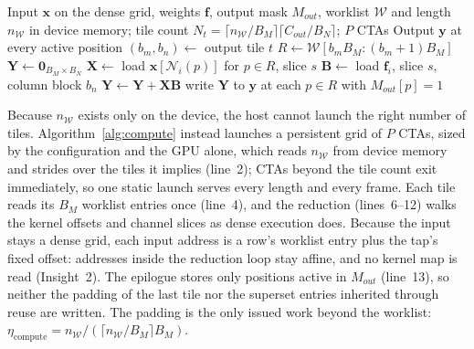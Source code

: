 \begin{algorithm}[t]
\caption{Worklist-Driven Tiled Compute (configuration $q$)}
\label{alg:compute}
\begin{algorithmic}[1]
\REQUIRE Input $\mathbf{x}$ on the dense grid, weights $\mathbf{f}$, output
  mask $M_{out}$, worklist $\mathcal{W}$ and length $n_{\mathcal{W}}$ in device
  memory; tile count
  $N_t=\lceil n_{\mathcal{W}}/B_M\rceil\lceil C_{out}/B_N\rceil$; $P$ CTAs
\ENSURE Output $\mathbf{y}$ at every active position
    \STATE $(b_m,b_n)\leftarrow$ output tile $t$
    \STATE $R\leftarrow\mathcal{W}[b_mB_M:(b_m+1)B_M]$ 
    \STATE $\mathbf{Y}\leftarrow\mathbf{0}_{B_M\times B_N}$
        \STATE $\mathbf{X}\leftarrow$ load $\mathbf{x}[\mathcal{N}_i(p)]$ for $p\in R$, slice $s$
        \STATE $\mathbf{B}\leftarrow$ load $\mathbf{f}_i$, slice $s$, column block $b_n$
        \STATE $\mathbf{Y}\leftarrow\mathbf{Y}+\mathbf{X}\mathbf{B}$
      \ENDFOR
    \ENDFOR
    \STATE write $\mathbf{Y}$ to $\mathbf{y}$ at each $p\in R$ with $M_{out}[p]=1$
  \ENDFOR
\ENDFOR
\end{algorithmic}
\end{algorithm}

Because $n_{\mathcal{W}}$ exists only on the device, the host cannot launch
the right number of tiles. Algorithm~\ref{alg:compute} instead launches a
persistent grid of $P$ CTAs, sized by the configuration and the GPU alone,
which reads $n_{\mathcal{W}}$ from device memory and strides over the tiles it
implies (line~2); CTAs beyond the tile count exit immediately, so one static
launch serves every length and every frame. Each tile reads its $B_M$ worklist
entries once (line~4), and the reduction (lines~6--12) walks the kernel
offsets and channel slices as dense execution does. Because the input stays a
dense grid, each input address is a row's worklist entry plus the tap's fixed
offset: addresses inside the reduction loop stay affine, and no kernel map is
read (Insight~2). The epilogue stores only positions active in $M_{out}$
(line~13), so neither the padding of the last tile nor the superset entries
inherited through reuse are written. The padding is the only issued work
beyond the worklist:
$\eta_{\mathrm{compute}}=n_{\mathcal{W}}/(\lceil n_{\mathcal{W}}/B_M\rceil
B_M)$.

